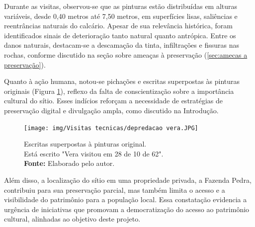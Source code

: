 Durante as visitas, observou-se que as pinturas estão distribuídas em alturas variáveis, desde 0,40 metros até 7,50 metros, em superfícies lisas, saliências e reentrâncias naturais do calcário. Apesar de sua relevância histórica, foram identificados sinais de deterioração tanto natural quanto antrópica. Entre os danos naturais, destacam-se a descamação da tinta, infiltrações e fissuras nas rochas, conforme discutido na seção sobre ameaças à preservação (\ref{sec:amecas a preservação}).

Quanto à ação humana, notou-se pichações e escritas superpostas às pinturas originais (Figura \ref{fig:degradacao vera}), reflexo da falta de conscientização sobre a importância cultural do sítio. Esses indícios reforçam a necessidade de estratégias de preservação digital e divulgação ampla, como discutido na Introdução.
\begin{figure}[H]
    \centering
    \texttt{[image: img/Visitas tecnicas/depredacao vera.JPG]}
    \caption{Escritas superpostas à pinturas original. \\ Está escrito "Vera visitou em 28 de 10 de 62". \\
        \textbf{Fonte:} Elaborado pelo autor.}
    \label{fig:degradacao vera}
\end{figure}

Além disso, a localização do sítio em uma propriedade privada, a Fazenda Pedra, contribuiu para sua preservação parcial, mas também limita o acesso e a visibilidade do patrimônio para a população local. Essa constatação evidencia a urgência de iniciativas que promovam a democratização do acesso ao patrimônio cultural, alinhadas ao objetivo deste projeto.

